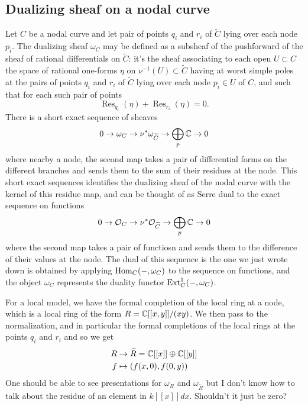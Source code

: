 \documentclass[12pt]{article}
\begin{document}
\subsection{Dualizing sheaf on a nodal curve}
Let $C$ be a nodal curve and let pair of points \( q_i \) and \( r_i \) of \( \widetilde{C} \) lying over each node \( p_i \). The dualizing sheaf \( \omega_C \) may be defined as a subsheaf of the pushforward of the sheaf of rational differentials on \( \widetilde{C} \): it’s the sheaf associating to each open \( U \subset C \) the space of rational one-forms \( \eta \) on \( \nu^{-1}(U) \subset \widetilde{C} \) having at worst simple poles at the pairs of points \( q_i \) and \( r_i \) of \( \widetilde{C} \) lying over each node \( p_i \in U \) of \( C \), and such that for each such pair of points
\[
\operatorname{Res}_{q_i}(\eta) + \operatorname{Res}_{r_i}(\eta) = 0.
\]
There is a short exact sequence of sheaves \begin{align*}
    0 \to \omega_C \to \nu^*\omega_{\widetilde{C}} \to \bigoplus_p \mathbb{C} \to 0
\end{align*} where nearby a node, the second map takes a pair of differential forms on the different branches and sends them to the sum of their residues at the node. This short exact sequences identifies the dualizing sheaf of the nodal curve with the kernel of this residue map, and can be thought of as Serre dual to the exact sequence on functions \begin{align*}
    0 \to \mathcal{O}_C \to \nu^*\mathcal{O}_{\widetilde{C}} \to \bigoplus_p \mathbb{C} \to 0
\end{align*}
where the second map takes a pair of functiosn and sends them to the difference of their values at the node. The dual of this sequence is the one we just wrote down is obtained by applying $\operatorname{Hom}_C(-, \omega_C)$ to the sequence on functions, and the object $\omega_C$ represents the duality functor $\operatorname{Ext} ^1_C(-, \omega_C)$.

For a local model, we have the formal completion of the local ring at a node, which is a local ring of the form \(R = \mathbb{C}[[x,y]]/(xy)\). We then pass to the normalization, and in particular the formal completions of the local rings at the points \(q_i\) and \(r_i\) and so we get \begin{align*}
    R &\to \widetilde R = \mathbb{C}[[x]] \oplus \mathbb{C}[[y]]  \\
    f &\mapsto (f(x,0), f(0,y))
\end{align*}
One should be able to see presentations for $\omega_R$ and $\omega_{\widetilde{R}}$ but I don't know how to talk about the residue of an element in $k[[x]] dx$. Shouldn't it just be zero? 
\end{document}
